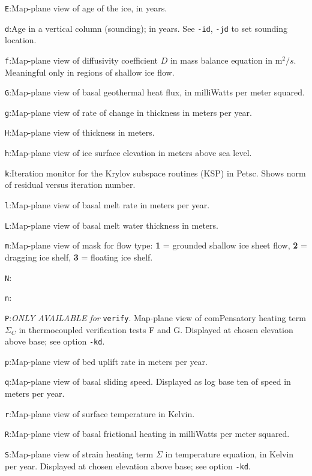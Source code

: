 \documentclass[11pt,final]{amsart}
\renewcommand{\t}[1]{\texttt{#1}}
\begin{document}
\verb|E|:\quad Map-plane view of age of the ice, in years.

\verb|d|:\quad Age in a vertical column (sounding); in years.  See \verb|-id|, \verb|-jd| to set sounding location.

\verb|f|:\quad Map-plane view of diffusivity coefficient $D$ in mass balance equation in $\text{m}^2/s$.  Meaningful only in regions of shallow ice flow.

\verb|G|:\quad Map-plane view of basal geothermal heat flux, in milliWatts per meter squared.

\verb|g|:\quad Map-plane view of rate of change in thickness in meters per year.

\verb|H|:\quad Map-plane view of thickness in meters.

\verb|h|:\quad Map-plane view of ice surface elevation in meters above sea level.

\verb|k|:\quad Iteration monitor for the Krylov subspace routines (KSP) in Petsc.  Shows norm of residual versus iteration number.

\verb|l|:\quad Map-plane view of basal melt rate in meters per year.

\verb|L|:\quad Map-plane view of basal melt water thickness in meters.

\verb|m|:\quad Map-plane view of mask for flow type:  \textbf{1} = grounded shallow ice sheet flow,  \textbf{2} = dragging ice shelf, \textbf{3} = floating ice shelf.

\verb|N|:\quad

\verb|n|:\quad

\verb|P|:\quad \emph{ONLY AVAILABLE for }\t{verify}.  Map-plane view of comPensatory heating term $\Sigma_C$ in thermocoupled verification tests F and G.  Displayed at chosen elevation above base; see option \verb|-kd|.

\verb|p|:\quad Map-plane view of bed uplift rate in meters per year.

\verb|q|:\quad Map-plane view of basal sliding speed.  Displayed as log base ten of speed in meters per year.

\verb|r|:\quad Map-plane view of surface temperature in Kelvin.

\verb|R|:\quad Map-plane view of basal frictional heating in milliWatts per meter squared.

\verb|S|:\quad Map-plane view of strain heating term $\Sigma$ in temperature equation, in Kelvin per year.  Displayed at chosen elevation above base; see option \verb|-kd|.
\end{document}
